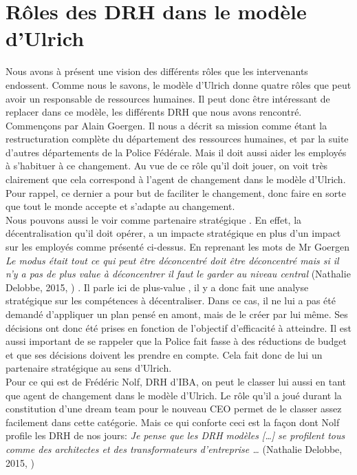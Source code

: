 \section{Rôles des DRH dans le modèle d'Ulrich}

Nous avons à présent une vision des différents rôles que les intervenants endossent. Comme nous le savons, le modèle d'Ulrich donne quatre rôles que peut avoir un responsable de ressources humaines. Il peut donc être intéressant de replacer dans ce modèle, les différents DRH que nous avons rencontré. \\

Commençons par Alain Goergen. Il nous a décrit sa mission comme étant la restructuration complète du département des ressources humaines, et par la suite d'autres départements de la Police Fédérale. Mais il doit aussi aider les employés à s'habituer à ce changement. Au vue de ce rôle qu'il doit jouer, on voit très clairement que cela correspond à l'\og agent de changement \fg{} dans le modèle d'Ulrich. Pour rappel, ce dernier a pour but de faciliter le changement, donc faire en sorte que tout le monde accepte et s'adapte au changement.\\

Nous pouvons aussi le voir comme \og partenaire stratégique \fg{}. En effet, la décentralisation qu'il doit opérer, a un impacte stratégique en plus d'un impact sur les employés comme présenté ci-dessus. En reprenant les mots de Mr Goergen \textit{\og Le modus était tout ce qui peut être déconcentré doit être déconcentré mais si il n’y a pas de plus value à déconcentrer il faut le garder au niveau central \fg{}} (Nathalie Delobbe, 2015, \cite{tableronde}) . Il parle ici de \og plus-value \fg{}, il y a donc fait une analyse stratégique sur les compétences à décentraliser. Dans ce cas, il ne lui a pas été demandé d'appliquer un plan pensé en amont, mais de le créer par lui même. Ses décisions ont donc été prises en fonction de l'objectif d'efficacité à atteindre. Il est aussi important de se rappeler que la Police fait fasse à des réductions de budget et que ses décisions doivent les prendre en compte. Cela fait donc de lui un \og partenaire stratégique \fg{} au sens d'Ulrich.\\   

Pour ce qui est de Frédéric Nolf, DRH d'IBA, on peut le classer lui aussi en tant que \og agent de changement \fg{} dans le modèle d'Ulrich. Le rôle qu'il a joué durant la constitution d'une \og{}dream team\fg{} pour le nouveau CEO permet de le classer assez facilement dans cette catégorie. Mais ce qui conforte ceci est la façon dont Nolf profile les DRH de nos jours: \og{} \textit{Je pense que les DRH modèles [\ldots] se profilent tous comme des architectes et des transformateurs d’entreprise \ldots} \fg{} (Nathalie Delobbe, 2015, \cite{tableronde}) \newline

